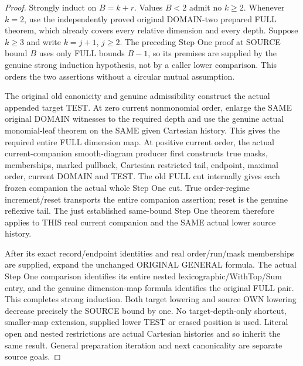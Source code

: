 \begin{proof}
Strongly induct on $B=k+r$. Values $B<2$ admit no $k\geq2$.
Whenever $k=2$, use the independently proved original DOMAIN-two
prepared FULL theorem, which already covers every relative dimension
and every depth. Suppose $k\geq3$ and write $k=j+1$, $j\geq2$.
The preceding Step One proof at SOURCE bound $B$ uses only FULL
bounds $B-1$, so its premises are supplied by the genuine strong
induction hypothesis, not by a caller lower comparison. This orders
the two assertions without a circular mutual assumption.

The original old canonicity and genuine admissibility construct the
actual appended target TEST. At zero current nonmonomial order,
enlarge the SAME original DOMAIN witnesses to the required depth and
use the genuine actual monomial-leaf theorem on the SAME given
Cartesian history. This gives the required entire FULL dimension map.
At positive current order, the actual current-companion smooth-diagram
producer first constructs true masks, memberships, marked pullback,
Cartesian restricted tail, endpoint, maximal order, current DOMAIN and
TEST. The old FULL cut internally gives each frozen companion the
actual whole Step One cut. True order-regime increment/reset transports
the entire companion assertion; reset is the genuine reflexive tail.
The just established same-bound Step One theorem therefore applies to
THIS real current companion and the SAME actual lower source history.

After its exact record/endpoint identities and real order/run/mask
memberships are supplied, expand the unchanged ORIGINAL GENERAL
formula. The actual Step One comparison identifies its entire nested
lexicographic/WithTop/Sum entry, and the genuine dimension-map formula
identifies the original FULL pair. This completes strong induction.
Both target lowering and source OWN lowering decrease precisely the
SOURCE bound by one. No target-depth-only shortcut, smaller-map
extension, supplied lower TEST or erased position is used. Literal
open and nested restrictions are actual Cartesian histories and so
inherit the same result. General preparation iteration and next
canonicality are separate source goals.
\end{proof}

